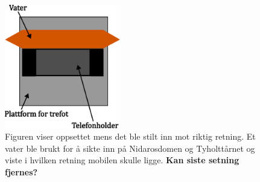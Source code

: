  
\begin{figure}
    \centering
    \includegraphics[width=0.45\textwidth]{img/Plattform med vater.pdf}                 
    \caption{Figuren viser oppsettet mens det ble stilt inn mot riktig retning. Et vater ble brukt for å sikte inn på Nidarosdomen og Tyholttårnet og viste i hvilken retning mobilen skulle ligge. \textbf{Kan siste setning fjernes?} 
        }
    \label{fig:med_vater}
\end{figure}